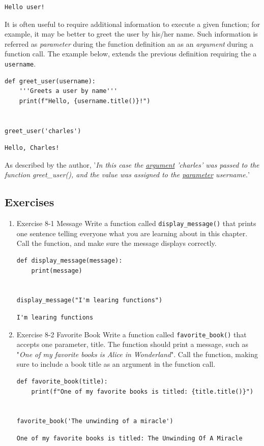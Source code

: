 \documentclass[10pt]{book}
\begin{document}
\label{orgfd31b1a}
\begin{verbatim}
Hello user!
\end{verbatim}

It is often useful to require additional information to execute a given
function; for example, it may be better to greet the user by his/her name. Such information is referred as \emph{parameter} during the function definition an as an \emph{argument} during a function call. The example below, extends the previous definition requiring the a \texttt{username}.

\label{orgdf11f75}
\begin{verbatim}
def greet_user(username):
    '''Greets a user by name'''
    print(f"Hello, {username.title()}!")


greet_user('charles')
\end{verbatim}

\label{orgce107c1}
\begin{verbatim}
Hello, Charles!
\end{verbatim}

As described by the author, '\emph{In this case the \uline{argument} 'charles' was passed to the function greet\_user(), and the value was assigned to the \uline{parameter} username.}'
\subsection{Exercises}
\label{sec:org98ad1ca}
\begin{enumerate}
\item Exercise 8-1 Message
\label{sec:org030865e}
Write a function called \texttt{display\_message()} that prints one sentence telling everyone what you are learning about in this chapter. Call the function, and make sure the message displays correctly.
\begin{verbatim}
def display_message(message):
    print(message)


display_message("I'm learing functions")
\end{verbatim}

\label{org6aa2274}
\begin{verbatim}
I'm learing functions
\end{verbatim}
\item Exercise 8-2 Favorite Book
\label{sec:org077082c}
Write a function called \texttt{favorite\_book()} that accepts one parameter, title. The function should print a message, such as "\emph{One of my favorite books is Alice in Wonderland}". Call the function, making sure to include a book title as an argument in the function call.
\begin{verbatim}
def favorite_book(title):
    print(f"One of my favorite books is titled: {title.title()}")


favorite_book('The unwinding of a miracle')
\end{verbatim}

\label{orgad27924}
\begin{verbatim}
One of my favorite books is titled: The Unwinding Of A Miracle
\end{verbatim}
\end{enumerate}
\end{document}
